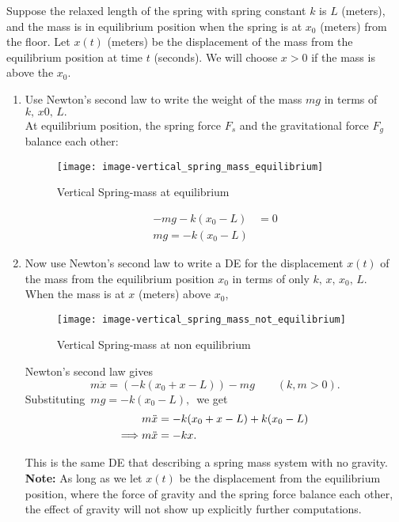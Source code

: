 Suppose the relaxed length of the spring with spring constant $k$ is $L$ (meters),
and the mass is in equilibrium position when the spring is at $x _0$ (meters) from the floor.
Let $x(t)$ (meters) be the displacement of the mass from the equilibrium position
at time $t$ (seconds). We will choose $x>0$ if the mass is above the $x _0$.
\begin{enumerate}
\item Use Newton's second law to write the weight of the mass $mg$ in terms of
  $k,\, x0,\,L.$\\
  At equilibrium position, the spring force $F_s$ and
  the gravitational force $F_g$ balance each other:
  \begin{figure}[ht!]
    \centering
    \texttt{[image: image-vertical\_spring\_mass\_equilibrium]}
    \caption{Vertical Spring-mass at equilibrium}
  \end{figure}

  \begin{align*}
    -mg  -k(x_0 -L) &= 0\\
    mg = -k(x_0 -L)
  \end{align*}
\clearpage
\item Now use Newton's second law to write a DE for the displacement $x(t)$ of the mass
  from the equilibrium position $x_0$ in terms of only $k,\, x,\, x_0,\,L$.\\

  When the mass is at $x$ (meters) above $x_0$,
  \begin{figure}[ht!]
    \centering
    \texttt{[image: image-vertical\_spring\_mass\_not\_equilibrium]}
    \caption{Vertical Spring-mass at non equilibrium}
  \end{figure}

  Newton's second law gives
  \begin{equation*}
    \displaystyle m \ddot x
    \displaystyle = 
    \displaystyle \left( -k(x_0+x-L)\right) -mg \qquad (k,m>0).
  \end{equation*}
  Substituting $\, mg=-k(x_0-L),\,$ we get
  \begin{align*}
    \displaystyle m\ddot{x}
    \displaystyle &= \displaystyle -k(x_0+x-L)+ k(x_0-L) \\
    \displaystyle \Longrightarrow
    \displaystyle m \ddot x
    \displaystyle &= -kx.  
  \end{align*}

  This is the same DE that describing a spring mass system with no gravity.
  \textbf{Note:} As long as we let $x(t)$ be the displacement from the equilibrium position,
  where the force of gravity and the spring force balance each other,
  the effect of gravity will not show up explicitly further computations.

\end{enumerate}

